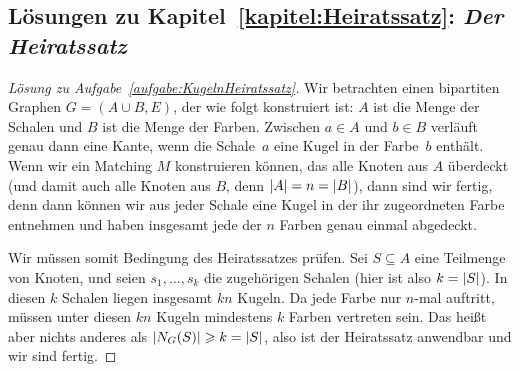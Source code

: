 
\subsection*{Lösungen zu Kapitel~\ref{kapitel:Heiratssatz}: \emph{Der Heiratssatz}}

\begin{proof}[Lösung zu Aufgabe~\ref{aufgabe:KugelnHeiratssatz}]
	Wir betrachten einen bipartiten Graphen $G=(A\cup B,E)$, der wie folgt konstruiert ist: $A$ ist die Menge der Schalen und $B$ ist die Menge der Farben. Zwischen $a\in A$ und $b\in B$ verläuft genau dann eine Kante, wenn die Schale~$a$ eine Kugel in der Farbe~$b$  enthält. Wenn wir ein Matching $M$ konstruieren können, das alle Knoten aus $A$ überdeckt (und damit auch alle Knoten aus $B$, denn $\lvert A\rvert=n=\lvert B\rvert$), dann sind wir fertig, denn dann können wir aus jeder Schale eine Kugel in der ihr zugeordneten Farbe entnehmen und haben insgesamt jede der $n$ Farben genau einmal abgedeckt.
	
	Wir müssen somit Bedingung des Heiratssatzes prüfen. Sei $S\subseteq A$ eine Teilmenge von Knoten, und seien $s_1,\dotsc,s_k$ die zugehörigen Schalen (hier ist also $k=\lvert S\rvert$). In diesen $k$ Schalen liegen insgesamt $kn$ Kugeln. Da jede Farbe nur $n$-mal auftritt, müssen unter diesen $kn$ Kugeln mindestens $k$ Farben vertreten sein. Das heißt aber nichts anderes als $\lvert N_G(S)\rvert\geqslant k=\lvert S\rvert$, also ist der Heiratssatz anwendbar und wir sind fertig.
\end{proof}

